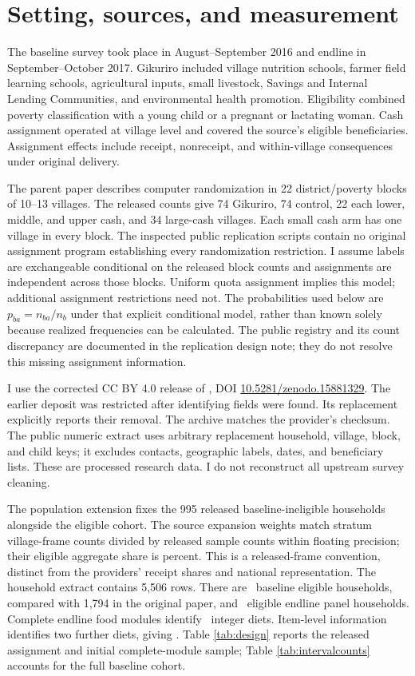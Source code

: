 \documentclass[11pt]{article}
\begin{document}
\section{Setting, sources, and measurement}

The baseline survey took place in August--September 2016 and endline in September--October 2017. Gikuriro included village nutrition schools, farmer field learning schools, agricultural inputs, small livestock, Savings and Internal Lending Communities, and environmental health promotion. Eligibility combined poverty classification with a young child or a pregnant or lactating woman. Cash assignment operated at village level and covered the source's eligible beneficiaries. Assignment effects include receipt, nonreceipt, and within-village consequences under original delivery.

The parent paper describes computer randomization in 22 district/poverty blocks of 10--13 villages. The released counts give 74 Gikuriro, 74 control, 22 each lower, middle, and upper cash, and 34 large-cash villages. Each small cash arm has one village in every block. The inspected public replication scripts contain no original assignment program establishing every randomization restriction. I assume labels are exchangeable conditional on the released block counts and assignments are independent across those blocks. Uniform quota assignment implies this model; additional assignment restrictions need not. The probabilities used below are $p_{ba}=n_{ba}/n_b$ under that explicit conditional model, rather than known solely because realized frequencies can be calculated. The public registry and its count discrepancy are documented in the replication design note; they do not resolve this missing assignment information.

I use the corrected CC BY 4.0 release of \citet{data2025}, DOI \href{https://doi.org/10.5281/zenodo.15881329}{10.5281/zenodo.15881329}. The earlier deposit was restricted after identifying fields were found. Its replacement explicitly reports their removal. The archive matches the provider's checksum. The public numeric extract uses arbitrary replacement household, village, block, and child keys; it excludes contacts, geographic labels, dates, and beneficiary lists. These are processed research data. I do not reconstruct all upstream survey cleaning.

The population extension fixes the 995 released baseline-ineligible households alongside the eligible cohort. The source expansion weights match stratum village-frame counts divided by released sample counts within floating precision; their eligible aggregate share is \CommunityEligibleShare percent. This is a released-frame convention, distinct from the providers' receipt shares and national representation. The household extract contains 5,506 rows. There are \BaselineN\ baseline eligible households, compared with 1,794 in the original paper, and \EndlineN\ eligible endline panel households. Complete endline food modules identify \DietN\ integer diets. Item-level information identifies two further diets, giving \IdentifiedDietN. Table \ref{tab:design} reports the released assignment and initial complete-module sample; Table \ref{tab:intervalcounts} accounts for the full baseline cohort.
\end{document}
